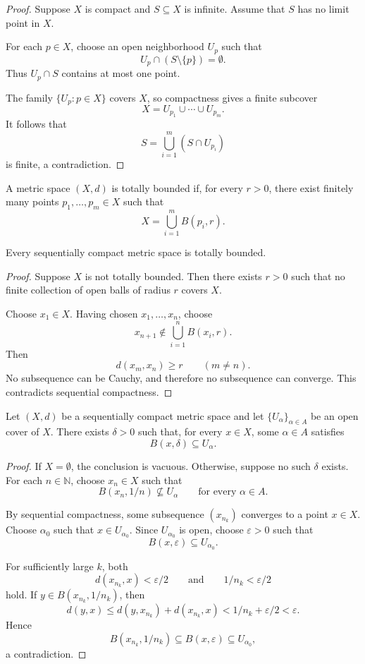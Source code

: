 \documentclass[answers,12pt,addpoints]{exam}
\begin{document}
\begin{proof}
Suppose $X$ is compact and $S\subseteq X$ is infinite.
Assume that $S$ has no limit point in $X$.

For each $p\in X$, choose an open neighborhood $U_p$ such
that
\[
U_p\cap(S\setminus\{p\})=\emptyset.
\]
Thus $U_p\cap S$ contains at most one point.

The family $\{U_p:p\in X\}$ covers $X$, so compactness gives
a finite subcover
\[
X=U_{p_1}\cup\cdots\cup U_{p_m}.
\]
It follows that
\[
S=\bigcup_{i=1}^{m}(S\cap U_{p_i})
\]
is finite, a contradiction.
\end{proof}

\begin{definition}
A metric space $(X,d)$ is totally bounded if, for every
$r>0$, there exist finitely many points
$p_1,\ldots,p_m\in X$ such that
\[
X=\bigcup_{i=1}^{m}B(p_i,r).
\]
\end{definition}

\begin{lemma}
Every sequentially compact metric space is totally bounded.
\end{lemma}

\begin{proof}
Suppose $X$ is not totally bounded. Then there exists
$r>0$ such that no finite collection of open balls of
radius $r$ covers $X$.

Choose $x_1\in X$. Having chosen $x_1,\ldots,x_n$, choose
\[
x_{n+1}\notin\bigcup_{i=1}^{n}B(x_i,r).
\]
Then
\[
d(x_m,x_n)\geq r
\qquad(m\neq n).
\]
No subsequence can be Cauchy, and therefore no subsequence
can converge. This contradicts sequential compactness.
\end{proof}

\begin{lemma}
Let $(X,d)$ be a sequentially compact metric space and let
$\{U_\alpha\}_{\alpha\in A}$ be an open cover of $X$.
There exists $\delta>0$ such that, for every $x\in X$,
some $\alpha\in A$ satisfies
\[
B(x,\delta)\subseteq U_\alpha.
\]
\end{lemma}

\begin{proof}
If $X=\emptyset$, the conclusion is vacuous.
Otherwise, suppose no such $\delta$ exists.
For each $n\in\mathbb{N}$, choose $x_n\in X$ such that
\[
B(x_n,1/n)\not\subseteq U_\alpha
\qquad\text{for every }\alpha\in A.
\]

By sequential compactness, some subsequence
$(x_{n_k})$ converges to a point $x\in X$.
Choose $\alpha_0$ such that $x\in U_{\alpha_0}$.
Since $U_{\alpha_0}$ is open, choose $\varepsilon>0$
such that
\[
B(x,\varepsilon)\subseteq U_{\alpha_0}.
\]

For sufficiently large $k$, both
\[
d(x_{n_k},x)<\varepsilon/2
\qquad\text{and}\qquad
1/n_k<\varepsilon/2
\]
hold. If $y\in B(x_{n_k},1/n_k)$, then
\[
d(y,x)
\leq d(y,x_{n_k})+d(x_{n_k},x)
<1/n_k+\varepsilon/2
<\varepsilon.
\]
Hence
\[
B(x_{n_k},1/n_k)
\subseteq B(x,\varepsilon)
\subseteq U_{\alpha_0},
\]
a contradiction.
\end{proof}
\end{document}
